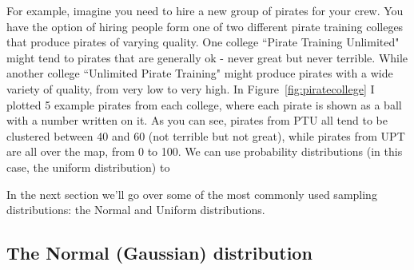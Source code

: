 \documentclass{tufte-book}\usepackage[]{graphicx}\usepackage[]{color}
\begin{document}
For example, imagine you need to hire a new group of pirates for your crew. You have the option of hiring people form one of two different pirate training colleges that produce pirates of varying quality. One college ``Pirate Training Unlimited" might tend to pirates that are generally ok - never great but never terrible. While another college ``Unlimited Pirate Training" might produce pirates with a wide variety of quality, from very low to very high. In Figure~\ref{fig:piratecollege} I plotted 5 example pirates from each college, where each pirate is shown as a ball with a number written on it. As you can see, pirates from PTU all tend to be clustered between 40 and 60 (not terrible but not great), while pirates from UPT are all over the map, from 0 to 100. We can use probability distributions (in this case, the uniform distribution) to 



In the next section we'll go over some of the most commonly used sampling distributions: the Normal and Uniform distributions.

\pagebreak
\subsection{The Normal (Gaussian) distribution}
\end{document}
